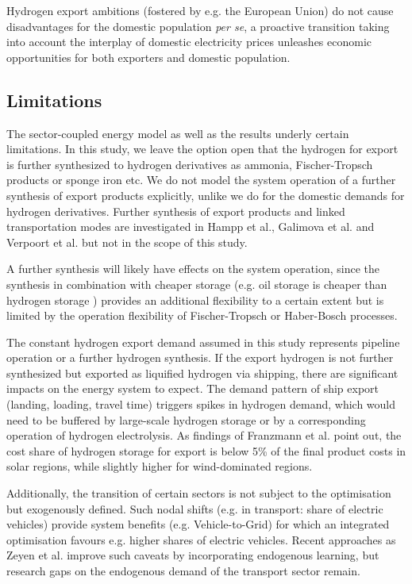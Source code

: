 Hydrogen export ambitions (fostered by e.g. the European Union) do not cause disadvantages for the domestic population \textit{per se}, a proactive transition taking into account the interplay of domestic electricity prices unleashes economic opportunities for both exporters and domestic population.



\subsection*{Limitations}
\label{subsec:limitations}

The sector-coupled energy model as well as the results underly certain limitations. In this study, we leave the option open that the hydrogen for export is further synthesized to hydrogen derivatives as ammonia, Fischer-Tropsch products or sponge iron etc. We do not model the system operation of a further synthesis of export products explicitly, unlike we do for the domestic demands for hydrogen derivatives. Further synthesis of export products and linked transportation modes are investigated in Hampp et al.\cite{Hampp2023}, Galimova et al.\cite{Galimova2023} and Verpoort et al.\cite{Verpoort2023} but not in the scope of this study.

A further synthesis will likely have effects on the system operation, since the synthesis in combination with cheaper storage (e.g. oil storage is cheaper than hydrogen storage \cite{DEA2019TechnologyData}) provides an additional flexibility to a certain extent but is limited by the operation flexibility of Fischer-Tropsch or Haber-Bosch processes.

The constant hydrogen export demand assumed in this study represents pipeline operation or a further hydrogen synthesis.
If the export hydrogen is not further synthesized but exported as liquified hydrogen via shipping, there are significant impacts on the energy system to expect. The demand pattern of ship export (landing, loading, travel time) triggers spikes in hydrogen demand, which would need to be buffered by large-scale hydrogen storage or by a corresponding operation of hydrogen electrolysis. As findings of Franzmann et al. \cite{Franzmann2023} point out, the cost share of hydrogen storage for export is below 5\% of the final product costs in solar regions, while slightly higher for wind-dominated regions.

Additionally, the transition of certain sectors is not subject to the optimisation but exogenously defined. Such nodal shifts (e.g. in transport: share of electric vehicles) provide system benefits (e.g. Vehicle-to-Grid) for which an integrated optimisation favours e.g. higher shares of electric vehicles.
Recent approaches as Zeyen et al.\cite{Zeyen2023} improve such caveats by incorporating endogenous learning, but research gaps on the endogenous demand of the transport sector remain.

